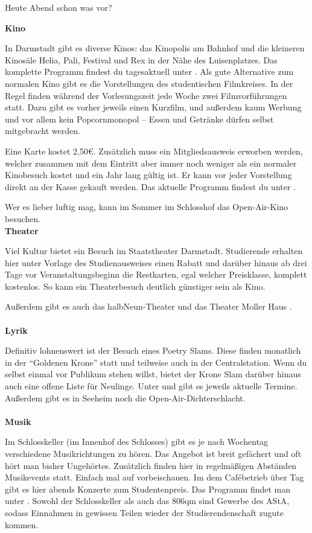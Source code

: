 {Heute Abend schon was vor?
}{
    \textbf{Kino}

    In Darmstadt gibt es diverse Kinos: das Kinopolis am Bahnhof und die kleineren Kinosäle Helia, Pali, Festival und Rex in der Nähe des Luisenplatzes. Das komplette Programm findest du tagesaktuell unter  \footnotemark[1].
    Als gute Alternative zum normalen Kino gibt es die Vorstellungen des studentischen Filmkreises. In der Regel finden während der Vorlesungszeit jede Woche zwei Filmvorführungen statt. Dazu gibt es vorher jeweils einen Kurzfilm, und außerdem kaum Werbung und vor allem kein Popcornmonopol – Essen und Getränke dürfen selbst mitgebracht werden.

    Eine Karte kostet 2,50\euro. Zusätzlich muss ein Mitgliedsausweis erworben werden, welcher zusammen mit dem Eintritt aber immer noch weniger als ein normaler Kinobesuch kostet und ein Jahr lang gültig ist. Er kann vor jeder Vorstellung direkt an der Kasse gekauft werden. Das aktuelle Programm findest du unter \footnotemark[2].

    Wer es lieber luftig mag, kann im Sommer im Schlosshof das Open-Air-Kino besuchen.\\

    \textbf{Theater}

    Viel Kultur bietet ein Besuch im Staatstheater Darmstadt. Studierende erhalten hier unter Vorlage des Studienausweises einen Rabatt und darüber hinaus ab drei Tage vor Veranstaltungsbeginn die Restkarten, egal welcher Preisklasse, komplett kostenlos. So kann ein Theaterbesuch deutlich günstiger sein als Kino.

    Außerdem gibt es auch das halbNeun-Theater \footnotemark[3] und das Theater Moller Haus \footnotemark[4].
    \\\\
    \textbf{Lyrik}

    Definitiv lohnenswert ist der Besuch eines Poetry Slams. Diese finden monatlich in der "`Goldenen Krone"' statt und teilweise auch in der Centralstation. Wenn du selbst einmal vor Publikum stehen willst, bietet der Krone Slam darüber hinaus auch eine offene Liste für Neulinge.
    Unter \footnotemark[5] und \footnotemark[6] gibt es jeweils aktuelle Termine. Außerdem gibt es in Seeheim noch die Open-Air-Dichterschlacht.
    \\\\
    \textbf{Musik}

    Im Schlosskeller (im Innenhof des Schlosses) gibt es je nach Wochentag verschiedene Musikrichtungen zu hören. Das Angebot ist breit gefächert und oft hört man bisher Ungehörtes. Zusätzlich finden hier in regelmäßigen Abständen Musikevents statt. Einfach mal auf \footnotemark[7] vorbeischauen.
    Im dem Caf\'ebetrieb über Tag gibt es hier abends Konzerte zum Studentenpreis. Das Programm findet man unter \footnotemark[8].
    Sowohl der Schlosskeller als auch das 806qm sind Gewerbe des AStA, sodass Einnahmen in gewissen Teilen wieder der Studierendenschaft zugute kommen.

}
